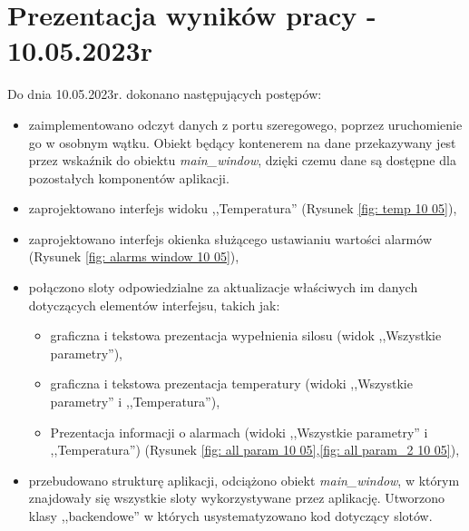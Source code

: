 \section{Prezentacja wyników pracy - 10.05.2023r}
    Do dnia 10.05.2023r. dokonano następujących postępów:
        \begin{itemize}
            \item zaimplementowano odczyt danych z portu szeregowego, poprzez uruchomienie go w osobnym wątku. 
                Obiekt będący kontenerem na dane przekazywany jest przez wskaźnik do obiektu \textit{main\_window}, dzięki
                czemu dane są dostępne dla pozostałych komponentów aplikacji.
            \item zaprojektowano interfejs widoku ,,Temperatura'' (Rysunek \ref{fig: temp 10 05}),
            \item zaprojektowano interfejs okienka służącego ustawianiu wartości alarmów (Rysunek \ref{fig: alarms window 10 05}),
            \item połączono sloty odpowiedzialne za aktualizacje właściwych im danych dotyczących elementów interfejsu, takich jak:
                \begin{itemize}
                    \item graficzna i tekstowa  prezentacja wypełnienia silosu (widok ,,Wszystkie parametry''),
                    \item graficzna i tekstowa prezentacja temperatury (widoki ,,Wszystkie parametry'' i ,,Temperatura''),
                    \item Prezentacja informacji o alarmach  (widoki ,,Wszystkie parametry'' i ,,Temperatura'') (Rysunek \ref{fig: all param 10 05},\ref{fig: all param_2 10 05}),
                \end{itemize}
            \item przebudowano strukturę aplikacji, odciążono obiekt \textit{main\_window}, w którym znajdowały się 
                wszystkie sloty wykorzystywane przez aplikację. Utworzono klasy ,,backendowe'' w których usystematyzowano
                kod dotyczący  slotów.
        \end{itemize}

